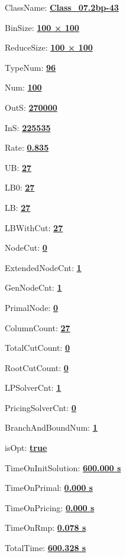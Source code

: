 \documentclass[11pt]{article}
\begin{document}
\pagestyle{empty}


ClassName: \underline{\textbf{Class_07.2bp-43}}
\par
BinSize: \underline{\textbf{100 × 100}}
\par
ReduceSize: \underline{\textbf{100 × 100}}
\par
TypeNum: \underline{\textbf{96}}
\par
Num: \underline{\textbf{100}}
\par
OutS: \underline{\textbf{270000}}
\par
InS: \underline{\textbf{225535}}
\par
Rate: \underline{\textbf{0.835}}
\par
UB: \underline{\textbf{27}}
\par
LB0: \underline{\textbf{27}}
\par
LB: \underline{\textbf{27}}
\par
LBWithCut: \underline{\textbf{27}}
\par
NodeCut: \underline{\textbf{0}}
\par
ExtendedNodeCnt: \underline{\textbf{1}}
\par
GenNodeCnt: \underline{\textbf{1}}
\par
PrimalNode: \underline{\textbf{0}}
\par
ColumnCount: \underline{\textbf{27}}
\par
TotalCutCount: \underline{\textbf{0}}
\par
RootCutCount: \underline{\textbf{0}}
\par
LPSolverCnt: \underline{\textbf{1}}
\par
PricingSolverCnt: \underline{\textbf{0}}
\par
BranchAndBoundNum: \underline{\textbf{1}}
\par
isOpt: \underline{\textbf{true}}
\par
TimeOnInitSolution: \underline{\textbf{600.000 s}}
\par
TimeOnPrimal: \underline{\textbf{0.000 s}}
\par
TimeOnPricing: \underline{\textbf{0.000 s}}
\par
TimeOnRmp: \underline{\textbf{0.078 s}}
\par
TotalTime: \underline{\textbf{600.328 s}}
\par
\newpage


\end{document}
